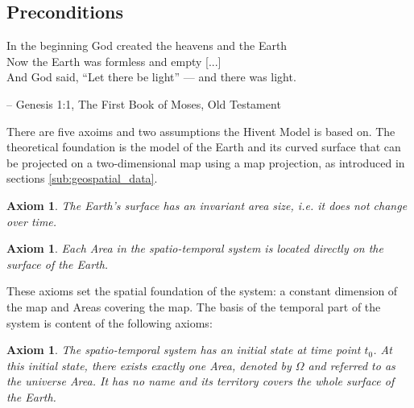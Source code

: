 

\subsection{Preconditions} %
\label{sub:preconditions}

\begin{quoteit}
  In the beginning God created the heavens and the Earth \\
  Now the Earth was formless and empty [...] \\
  And God said, “Let there be light” --- and there was light.
\end{quoteit}
\hfill -- Genesis 1:1, The First Book of Moses, Old Testament
\vspace{1em}


There are five axoims and two assumptions the Hivent Model is based on. The theoretical foundation is the model of the Earth and its curved surface that can be projected on a two-dimensional map using a map projection, as introduced in sections \ref{sub:geospatial_data}.

\newtheorem{invariant_surface}[assicounter]{Axiom}
\begin{invariant_surface}
\label{axm:invariant_surface}
  The Earth's surface has an invariant area size, i.e. it does not change over time.
\end{invariant_surface}

\vspace{-2.0em}
\newtheorem{area_on_surface}[assicounter]{Axiom}
\begin{area_on_surface}
\label{axm:area_on_surface}
  Each Area in the spatio-temporal system is located directly on the surface of the Earth.
\end{area_on_surface}

These axioms set the spatial foundation of the system: a constant dimension of the map and Areas covering the map. The basis of the temporal part of the system is content of the following axioms:

\vspace{-1.0em}
\newtheorem{initial_configuration}[assicounter]{Axiom}
\begin{initial_configuration}
\label{axm:initial_configuration}
  The spatio-temporal system has an initial state at time point $t_0$. At this initial state, there exists exactly one Area, denoted by $\Omega$ and referred to as the \emph{universe} Area. It has no name and its territory covers the whole surface of the Earth.
\end{initial_configuration}

